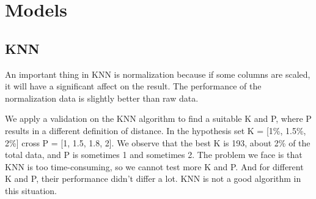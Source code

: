 \section{Models}
\subsection*{KNN}

An important thing in KNN is normalization because if some columns are scaled, it will have a significant affect on the result. The performance of the normalization data is slightly better than raw data.

We apply a validation on the KNN algorithm to find a suitable K and P, where P results in a different definition of distance. In the hypothesis set K = [1\%, 1.5\%, 2\%] cross P = [1, 1.5, 1.8, 2]. We observe that the best K is 193, about 2\% of the total data, and P is sometimes 1 and sometimes 2. The problem we face is that KNN is too time-consuming, so we cannot test more K and P. And for different K and P, their performance didn't differ a lot. KNN is not a good algorithm in this situation.
